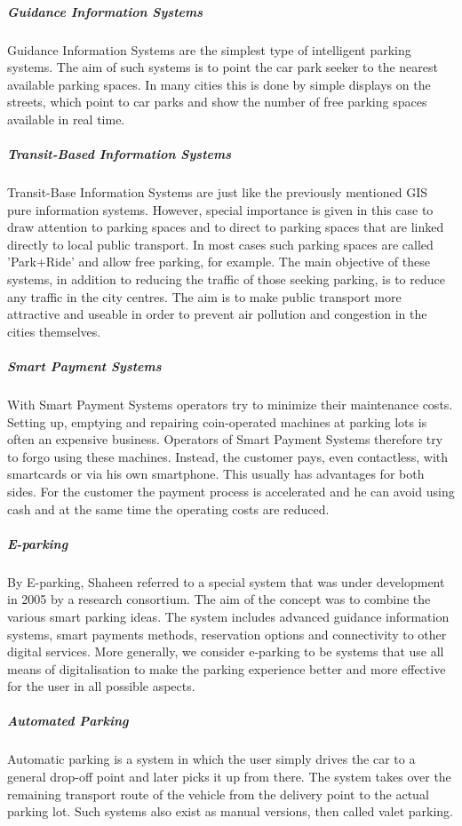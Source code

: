 \documentclass[
a4paper,     %
titlepage,   %
14pt         %
]{scrartcl}  %
\theoremstyle{mystyle}
\begin{document}
\subparagraph{Guidance Information Systems}
Guidance Information Systems are the simplest type of intelligent parking systems. The aim of such systems is to point the car park seeker to the nearest available parking spaces. In many cities this is done by simple displays on the streets, which point to car parks and show the number of free parking spaces available in real time.

\subparagraph{Transit-Based Information Systems}
Transit-Base Information Systems are just like the previously mentioned GIS pure information systems. However, special importance is given in this case to draw attention to parking spaces and to direct to parking spaces that are linked directly to local public transport. In most cases such parking spaces are called 'Park+Ride' and allow free parking, for example. The main objective of these systems, in addition to reducing the traffic of those seeking parking, is to reduce any traffic in the city centres. The aim is to make public transport more attractive and useable in order to prevent air pollution and congestion in the cities themselves. 

\subparagraph{Smart Payment Systems}
With Smart Payment Systems operators try to minimize their maintenance costs. Setting up, emptying and repairing coin-operated machines at parking lots is often an expensive business. Operators of Smart Payment Systems therefore try to forgo using these machines. Instead, the customer pays, even contactless, with smartcards or via his own smartphone. This usually has advantages for both sides. For the customer the payment process is accelerated and he can avoid using cash and at the same time the operating costs are reduced.

\subparagraph{E-parking}
By E-parking, Shaheen referred to a special system that was under development in 2005 by a research consortium. The aim of the concept was to combine the various smart parking ideas. The system includes advanced guidance information systems, smart payments methods, reservation options and connectivity to other digital services. More generally, we consider e-parking to be systems that use all means of digitalisation to make the parking experience better and more effective for the user in all possible aspects.

\subparagraph{Automated Parking}
Automatic parking is a system in which the user simply drives the car to a general drop-off point and later picks it up from there. The system takes over the remaining transport route of the vehicle from the delivery point to the actual parking lot. Such systems also exist as manual versions, then called valet parking.\\
\end{document}
